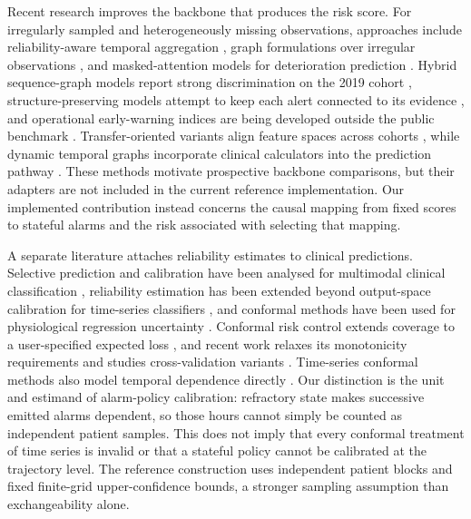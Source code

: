 Recent research improves the backbone that produces the risk score. For irregularly sampled and heterogeneously missing observations, approaches include reliability-aware temporal aggregation \citep{kim2026retamamba,shen2026enhancing}, graph formulations over irregular observations \citep{yalavarthi2024grafiti}, and masked-attention models for deterioration prediction \citep{mun2026made}. Hybrid sequence-graph models report strong discrimination on the 2019 cohort \citep{khorram2026early}, structure-preserving models attempt to keep each alert connected to its evidence \citep{ou2026sepsislens}, and operational early-warning indices are being developed outside the public benchmark \citep{bertsimas2025early}. Transfer-oriented variants align feature spaces across cohorts \citep{komolafe2025early}, while dynamic temporal graphs incorporate clinical calculators into the prediction pathway \citep{yin2024sepsiscalc}. These methods motivate prospective backbone comparisons, but their adapters are not included in the current reference implementation. Our implemented contribution instead concerns the causal mapping from fixed scores to stateful alarms and the risk associated with selecting that mapping.

A separate literature attaches reliability estimates to clinical predictions. Selective prediction and calibration have been analysed for multimodal clinical classification \citep{lpez2026empirical}, reliability estimation has been extended beyond output-space calibration for time-series classifiers \citep{cenacchi2026beyond}, and conformal methods have been used for physiological regression uncertainty \citep{strickland2025degrees}. Conformal risk control extends coverage to a user-specified expected loss \citep{angelopoulos2022conformal}, and recent work relaxes its monotonicity requirements and studies cross-validation variants \citep{angelopoulos2026conformal,cohen2024crossvalidation}. Time-series conformal methods also model temporal dependence directly \citep{angelopoulos2023conformal,english2024janet}. Our distinction is the unit and estimand of alarm-policy calibration: refractory state makes successive emitted alarms dependent, so those hours cannot simply be counted as independent patient samples. This does not imply that every conformal treatment of time series is invalid or that a stateful policy cannot be calibrated at the trajectory level. The reference construction uses independent patient blocks and fixed finite-grid upper-confidence bounds, a stronger sampling assumption than exchangeability alone.

